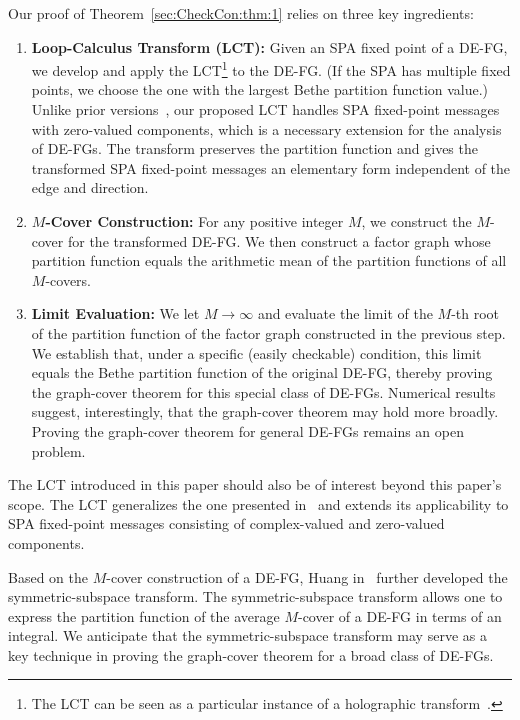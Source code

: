 \documentclass[journal]{IEEEtran}
\newcommand{\add}[1]{{\color{black}#1}}
\begin{document}
Our proof of Theorem~\ref{sec:CheckCon:thm:1} relies on three key ingredients:
\begin{enumerate}

  \item \textbf{Loop-Calculus Transform (LCT):} \add{Given an SPA fixed point of
          a DE-FG, we develop and apply the LCT}\footnote{The \add{LCT} can be seen
          as a particular instance of a holographic
          transform~\cite{AlBashabsheh2011}.}\add{ to the DE-FG.} (If the SPA has
        multiple fixed points, we choose the one with the largest Bethe partition
        function value.) Unlike prior
        versions~\cite{Chertkov2006,Chernyak2007,Mori2015}, our proposed LCT handles
        SPA fixed-point messages with zero-valued components, which is a necessary
        extension for the analysis of DE-FGs. \add{The transform preserves the
          partition function and gives the transformed SPA fixed-point messages an
          elementary form independent of the edge and direction.}

  \item \textbf{$M$-Cover Construction:} For any positive integer $M$, we
        construct the $M$-cover for the transformed DE-FG. We then construct a
        factor graph whose partition function equals the arithmetic mean of the
        partition functions of all $M$-covers.

  \item \textbf{Limit Evaluation:} We let $M \to \infty$ and evaluate the limit
        of the $M$-th root of the partition function of the factor graph constructed
        in the previous step. We establish that, under a specific (easily checkable)
        condition, this limit equals the Bethe partition function of the original
        DE-FG, thereby proving the graph-cover theorem for this special class of
        DE-FGs. Numerical results suggest, interestingly, that the graph-cover
        theorem may hold more broadly. Proving the graph-cover theorem for general
        DE-FGs remains an open problem.

\end{enumerate}

The LCT introduced in this paper should also be of interest beyond this
paper's scope. The LCT generalizes the one presented in~\cite{Mori2015} and
extends its applicability to SPA fixed-point messages consisting of
complex-valued and zero-valued components.

Based on the $M$-cover construction of a DE-FG, Huang in~\cite[Chapter
  5]{Huang2024} further developed the symmetric-subspace transform. The
symmetric-subspace transform allows one to express the partition function of
the average $M$-cover of a DE-FG in terms of an integral. We anticipate that
the symmetric-subspace transform may serve as a key technique in proving the
graph-cover theorem for a broad class of DE-FGs.
\end{document}
